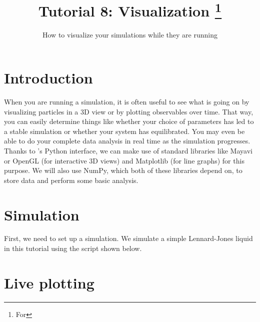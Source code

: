 \documentclass[
paper=a4,                       %
fontsize=11pt,                  %
twoside,                        %
footsepline,                    %
headsepline,                    %
headinclude=false,              %
footinclude=false,              %
pagesize,                       %
]{scrartcl}
\begin{document}
\esptitlehead

\title{Tutorial 8: Visualization%
\ifdefined\esversion%
\thanks{For \es \esversion}%
\fi%
}
\subtitle{How to visualize your \es simulations while they are running}
\maketitle

\section{Introduction}
\label{intro}

When you are running a simulation, it is often useful to see what is going on by visualizing particles in a 3D view or by plotting observables over time.
That way, you can easily determine things like whether your choice of parameters has led to a stable simulation or whether your system has equilibrated.
You may even be able to do your complete data analysis in real time as the simulation progresses.\\

\noindent Thanks to \es's Python interface, we can make use of standard libraries like Mayavi or OpenGL (for interactive 3D views) and Matplotlib (for line graphs) for this purpose.
We will also use NumPy, which both of these libraries depend on, to store data and perform some basic analysis.

\section{Simulation}
\label{sim}

First, we need to set up a simulation.
We simulate a simple Lennard-Jones liquid in this tutorial using the script shown below.


\section{Live plotting}
\label{plot}
\end{document}
